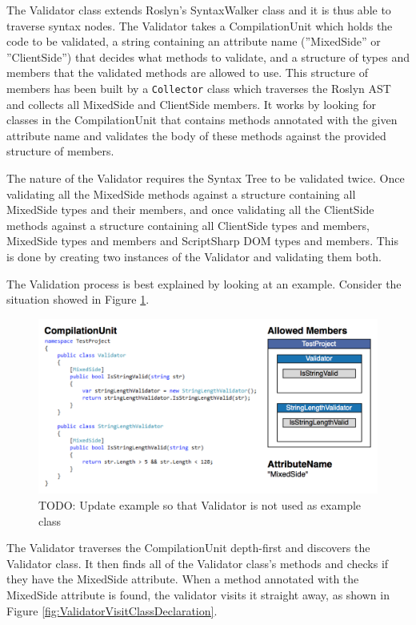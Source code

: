 The Validator class extends Roslyn's SyntaxWalker class and it is thus able to traverse syntax nodes. The Validator takes a CompilationUnit which holds the code to be validated, a string containing an attribute name (''MixedSide'' or ''ClientSide'') that decides what methods to validate, and a structure of types and members that the validated methods are allowed to use. This structure of members has been built by a \texttt{Collector} class which traverses the Roslyn AST and collects all MixedSide and ClientSide members.
It works by looking for classes in the CompilationUnit that contains methods annotated with the given attribute name and validates the body of these methods against the provided structure of members.

The nature of the Validator requires the Syntax Tree to be validated twice. Once validating all the MixedSide methods against a structure containing all MixedSide types and their members, and once validating all the ClientSide methods against a structure containing all ClientSide types and members, MixedSide types and members and ScriptSharp DOM types and members. This is done by creating two instances of the Validator and validating them both.

The Validation process is best explained by looking at an example. Consider the situation showed in Figure \ref{fig:mixedSideValidationExample}. 

\begin{figure}[H]
	\begin{center}
		\centerline{\includegraphics[width=14cm]{resources/images/MixedSideValidationExample.png}}
	\end{center}
	\caption{TODO: Update example so that Validator is not used as example class}
	\label{fig:mixedSideValidationExample}
\end{figure}		

The Validator traverses the CompilationUnit depth-first and discovers the Validator class. It then finds all of the Validator class's methods and checks if they have the MixedSide attribute. When a method annotated with the MixedSide attribute is found, the validator visits it straight away, as shown in Figure \ref{fig:ValidatorVisitClassDeclaration}. 

